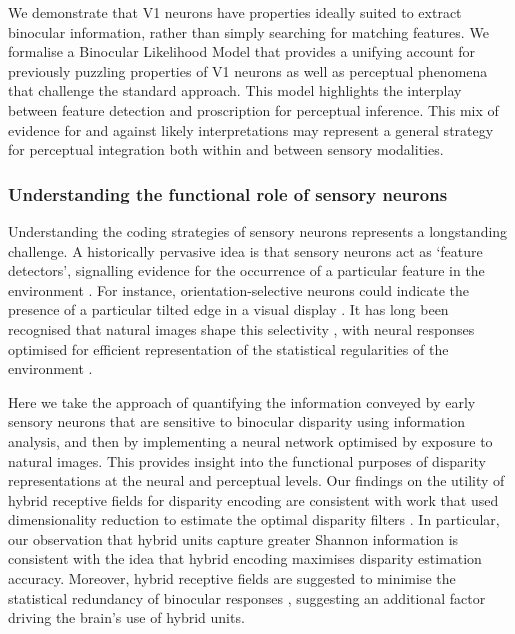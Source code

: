 We demonstrate that V1 neurons have properties ideally suited to extract binocular information, rather than simply searching for matching features. We formalise a Binocular Likelihood Model that provides a unifying account for previously puzzling properties of V1 neurons as well as perceptual phenomena that challenge the standard approach. This model highlights the interplay between feature detection and proscription for perceptual inference. This mix of evidence for and against likely interpretations may represent a general strategy for perceptual integration both within and between sensory modalities.

\subsubsection*{Understanding the functional role of sensory neurons}

Understanding the coding strategies of sensory neurons represents a longstanding challenge. A historically pervasive idea is that sensory neurons act as `feature detectors', signalling evidence for the occurrence of a particular feature in the environment \cite{Barlow:1953ep, Lettvin:1959gs}. For instance, orientation-selective neurons could indicate the presence of a particular tilted edge in a visual display \cite{HUBEL:1959tz}. It has long been recognised that natural images shape this selectivity \cite{Barlow:1961fe, Simoncelli:2001dn}, with neural responses optimised for efficient representation of the statistical regularities of the environment \cite{Karklin:2009hl, Li:1994jm}. 

Here we take the approach of quantifying the information conveyed by early sensory neurons that are sensitive to binocular disparity using information analysis, and then by implementing a neural network optimised by exposure to natural images. This provides insight into the functional purposes of disparity representations at the neural and perceptual levels. Our findings on the utility of hybrid receptive fields for disparity encoding are consistent with work that used dimensionality reduction to estimate the optimal disparity filters \cite{Burge:2014qj}. In particular, our observation that hybrid units capture greater Shannon information is consistent with the idea that hybrid encoding maximises disparity estimation accuracy. Moreover, hybrid receptive fields are suggested to minimise the statistical redundancy of binocular responses \cite{Okajima:2004cy,Hunter:2015kx, Hunter:2016gb}, suggesting an additional factor driving the brain's use of hybrid units.

